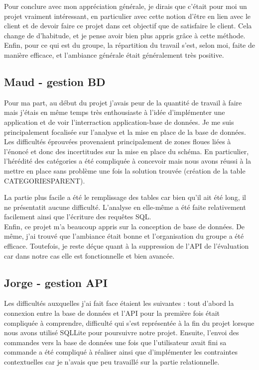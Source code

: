 \documentclass[10pt, a4paper]{article}
\begin{document}
Pour conclure avec mon appréciation générale, je dirais que c'était pour moi un projet vraiment
intéressant, en particulier avec cette notion d'être en lien avec le client et de devoir faire ce projet dans cet objectif que de satisfaire le client.
Cela change de d'habitude, et je pense avoir bien plus appris grâce à cette méthode.
Enfin, pour ce qui est du groupe, la répartition du travail s'est, selon moi, faite de manière efficace, et l'ambiance générale était généralement très positive.

\subsection{Maud - gestion BD}
Pour ma part, au début du projet j'avais peur de la quantité de travail à faire mais j'étais
en même temps très enthousiaste à l'idée d'implémenter une application et de voir l'interraction
application-base de données. Je me suis principalement focalisée sur l'analyse et la mise en
place de la base de données.\\

Les difficultés éprouvées provenaient principalement de zones floues liées à l'énoncé et donc
des incertitudes sur la mise en place du schéma. En particulier, l'hérédité des catégories a été
compliquée à concevoir mais nous avons réussi à la mettre en place sans problème une fois la
solution trouvée (création de la table CATEGORIESPARENT).

La partie plus facile a été le remplissage des tables car bien qu'il ait été long, il ne
présentatit aucune difficulté. L'analyse en elle-même a été faite relativement facilement
ainsi que l'écriture des requêtes SQL.\\

Enfin, ce projet m'a beaucoup appris sur la conception de base de données. De même, j'ai trouvé
que l'ambiance était bonne et l'organisation du groupe a été efficace. Toutefois, je reste déçue
quant à la suppression de l'API de l'évaluation car dans notre cas elle est fonctionnelle et bien avancée.

\subsection{Jorge - gestion API}
Les difficultés auxquelles j'ai fait face étaient les suivantes : tout d'abord la connexion entre la base de données
et l'API pour la première fois était compliquée à comprendre, difficulté qui s'est représentée
à la fin du projet lorsque nous avons utilisé SQLLite pour poursuivre notre projet. Ensuite,
l'envoi des commandes vers la base de données une fois que l'utilisateur avait fini sa commande
a été compliqué à réaliser ainsi que d'implémenter les contraintes contextuelles car je
n'avais que peu travaillé sur la partie relationnelle. \\
\end{document}
